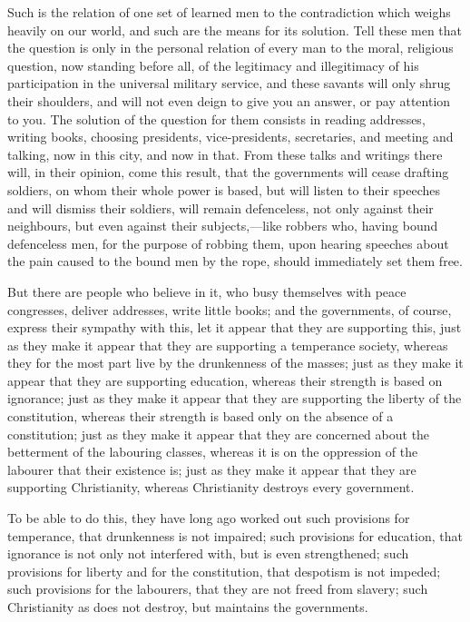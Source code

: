 \documentclass{book}
\begin{document}
Such is the relation of one set of learned men to the contradiction which weighs heavily on our world, and such are the means for its solution. Tell these men that the question is only in the personal relation of every man to the moral, religious question, now standing before all, of the legitimacy and illegitimacy of his participation in the universal military service, and these savants will only shrug their shoulders, and will not even deign to give you an answer, or pay attention to you. The solution of the question for them consists in reading addresses, writing books, choosing presidents, vice-presidents, secretaries, and meeting and talking, now in this city, and now in that. From these talks and writings there will, in their opinion, come this result, that the governments will cease drafting soldiers, on whom their whole power is based, but will listen to their speeches and will dismiss their soldiers, will remain defenceless, not only against their neighbours, but even against their subjects,—like robbers who, having bound defenceless men, for the purpose of robbing them, upon hearing speeches about the pain caused to the bound men by the rope, should immediately set them free.

But there are people who believe in it, who busy themselves with peace congresses, deliver addresses, write little books; and the governments, of course, express their sympathy with this, let it appear that they are supporting this, just as they make it appear that they are supporting a temperance society, whereas they for the most part live by the drunkenness of the masses; just as they make it appear that they are supporting education, whereas their strength is based on ignorance; just as they make it appear that they are supporting the liberty of the constitution, whereas their strength is based only on the absence of a constitution; just as they make it appear that they are concerned about the betterment of the labouring classes, whereas it is on the oppression of the labourer that their existence is; just as they make it appear that they are supporting Christianity, whereas Christianity destroys every government.

To be able to do this, they have long ago worked out such provisions for temperance, that drunkenness is not impaired; such provisions for education, that ignorance is not only not interfered with, but is even strengthened; such provisions for liberty and for the constitution, that despotism is not impeded; such provisions for the labourers, that they are not freed from slavery; such Christianity as does not destroy, but maintains the governments.
\end{document}
